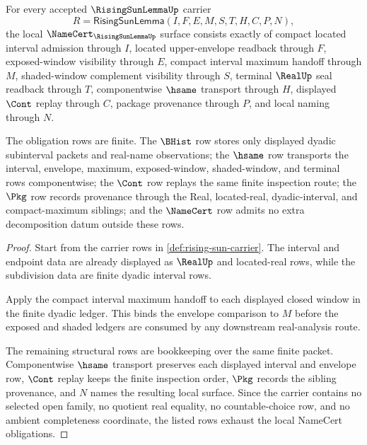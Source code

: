 \begin{theorem}
\label{thm:rising-sun-namecert-obligations}
For every accepted $\RisingSunLemmaUp$ carrier
$$
R=\mathsf{RisingSunLemma}(I,F,E,M,S,T,H,C,P,N),
$$
the local $\NameCert_{\RisingSunLemmaUp}$ surface consists exactly of compact located interval admission through $I$, located upper-envelope readback through $F$, exposed-window visibility through $E$, compact interval maximum handoff through $M$, shaded-window complement visibility through $S$, terminal $\RealUp$ seal readback through $T$, componentwise $\hsame$ transport through $H$, displayed $\Cont$ replay through $C$, package provenance through $P$, and local naming through $N$.

The obligation rows are finite. The $\BHist$ row stores only displayed dyadic subinterval packets and real-name observations; the $\hsame$ row transports the interval, envelope, maximum, exposed-window, shaded-window, and terminal rows componentwise; the $\Cont$ row replays the same finite inspection route; the $\Pkg$ row records provenance through the Real, located-real, dyadic-interval, and compact-maximum siblings; and the $\NameCert$ row admits no extra decomposition datum outside these rows.
\end{theorem}
\begin{proof}
Start from the carrier rows in \autoref{def:rising-sun-carrier}. The interval and endpoint data are already displayed as $\RealUp$ and located-real rows, while the subdivision data are finite dyadic interval rows.

Apply the compact interval maximum handoff to each displayed closed window in the finite dyadic ledger. This binds the envelope comparison to $M$ before the exposed and shaded ledgers are consumed by any downstream real-analysis route.

The remaining structural rows are bookkeeping over the same finite packet. Componentwise $\hsame$ transport preserves each displayed interval and envelope row, $\Cont$ replay keeps the finite inspection order, $\Pkg$ records the sibling provenance, and $N$ names the resulting local surface. Since the carrier contains no selected open family, no quotient real equality, no countable-choice row, and no ambient completeness coordinate, the listed rows exhaust the local NameCert obligations.
\end{proof}

